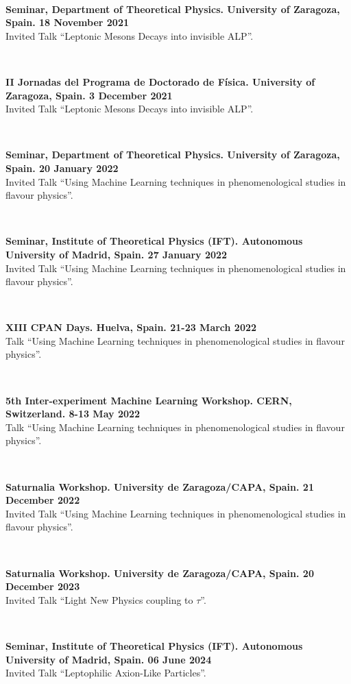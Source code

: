 \documentclass{cvf}
\begin{document}
~

\textbf{Seminar, Department of Theoretical Physics. University of Zaragoza, Spain. 18 November 2021}\\
Invited Talk ``Leptonic Mesons Decays into invisible ALP''.

~

\textbf{II Jornadas del Programa de Doctorado de Física. University of Zaragoza, Spain. 3 December 2021}\\
Invited Talk ``Leptonic Mesons Decays into invisible ALP''.

~

\textbf{Seminar, Department of Theoretical Physics. University of Zaragoza, Spain. 20 January 2022}\\
Invited Talk ``Using Machine Learning techniques in phenomenological studies in flavour physics''.

~

\textbf{Seminar, Institute of Theoretical Physics (IFT). Autonomous University of Madrid, Spain. 27 January 2022}\\
Invited Talk ``Using Machine Learning techniques in phenomenological studies in flavour physics''.

~

\textbf{XIII CPAN Days. Huelva, Spain. 21-23 March 2022}\\
Talk ``Using Machine Learning techniques in phenomenological studies in flavour physics''.

~

\textbf{5th Inter-experiment Machine Learning Workshop. CERN, Switzerland. 8-13 May 2022}\\
Talk ``Using Machine Learning techniques in phenomenological studies in flavour physics''.

~

\textbf{Saturnalia Workshop. University de Zaragoza/CAPA, Spain. 21 December 2022}\\
Invited Talk ``Using Machine Learning techniques in phenomenological studies in flavour physics''.

~

\textbf{Saturnalia Workshop. University de Zaragoza/CAPA, Spain. 20 December 2023}\\
Invited Talk ``Light New Physics coupling to $\tau$''.

~

\textbf{Seminar, Institute of Theoretical Physics (IFT). Autonomous University of Madrid, Spain. 06 June 2024}\\
Invited Talk ``Leptophilic Axion-Like Particles''.
\end{document}

